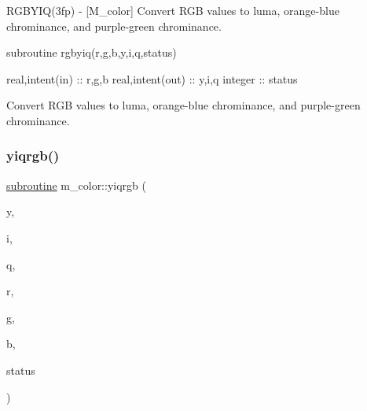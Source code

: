 \begin{DoxyDescription}
\item[\label{_RGBYIQ}%
N\+A\+ME ]R\+G\+B\+Y\+I\+Q(3fp) -\/ \mbox{[}M\+\_\+color\mbox{]} Convert R\+GB values to luma, orange-\/blue chrominance, and purple-\/green chrominance. 


\item[S\+Y\+N\+O\+P\+S\+IS ]
\begin{DoxyPre}
    subroutine rgbyiq(r,g,b,y,i,q,status)\end{DoxyPre}



\begin{DoxyPre}     real,intent(in)  :: r,g,b
     real,intent(out) :: y,i,q
     integer          :: status
    \end{DoxyPre}
 


\item[D\+E\+S\+C\+R\+I\+P\+T\+I\+ON ]Convert R\+GB values to luma, orange-\/blue chrominance, and purple-\/green chrominance. 


\end{DoxyDescription}\mbox{\label{namespacem__color_ac9cd845fb9975144a6deb3a21ce29a29}} 
\subsubsection{\texorpdfstring{yiqrgb()}{yiqrgb()}}
{\footnotesize\ttfamily \hyperlink{M__stopwatch_83_8txt_acfbcff50169d691ff02d4a123ed70482}{subroutine} m\+\_\+color\+::yiqrgb (\begin{DoxyParamCaption}\item[{\hyperlink{read__watch_83_8txt_abdb62bde002f38ef75f810d3a905a823}{real}, intent(\hyperlink{M__journal_83_8txt_afce72651d1eed785a2132bee863b2f38}{in})}]{y,  }\item[{\hyperlink{read__watch_83_8txt_abdb62bde002f38ef75f810d3a905a823}{real}, intent(\hyperlink{M__journal_83_8txt_afce72651d1eed785a2132bee863b2f38}{in})}]{i,  }\item[{\hyperlink{read__watch_83_8txt_abdb62bde002f38ef75f810d3a905a823}{real}, intent(\hyperlink{M__journal_83_8txt_afce72651d1eed785a2132bee863b2f38}{in})}]{q,  }\item[{\hyperlink{read__watch_83_8txt_abdb62bde002f38ef75f810d3a905a823}{real}, intent(out)}]{r,  }\item[{\hyperlink{read__watch_83_8txt_abdb62bde002f38ef75f810d3a905a823}{real}, intent(out)}]{g,  }\item[{\hyperlink{read__watch_83_8txt_abdb62bde002f38ef75f810d3a905a823}{real}, intent(out)}]{b,  }\item[{integer}]{status }\end{DoxyParamCaption})\hspace{0.3cm}{\ttfamily [private]}}


